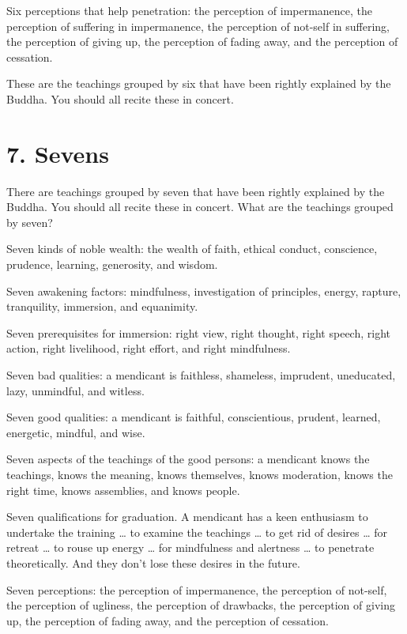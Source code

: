\documentclass[12pt,openany]{book}%
\begin{document}
Six perceptions that help penetration: the perception of impermanence, the perception of suffering in impermanence, the perception of not-self in suffering, the perception of giving up, the perception of fading away, and the perception of cessation. 

These are the teachings grouped by six that have been rightly explained by the Buddha. You should all recite these in concert. 

\section*{7. Sevens }

There are teachings grouped by seven that have been rightly explained by the Buddha. You should all recite these in concert. What are the teachings grouped by seven? 

Seven kinds of noble wealth: the wealth of faith, ethical conduct, conscience, prudence, learning, generosity, and wisdom. 

Seven awakening factors: mindfulness, investigation of principles, energy, rapture, tranquility, immersion, and equanimity. 

Seven prerequisites for immersion: right view, right thought, right speech, right action, right livelihood, right effort, and right mindfulness. 

Seven bad qualities: a mendicant is faithless, shameless, imprudent, uneducated, lazy, unmindful, and witless. 

Seven good qualities: a mendicant is faithful, conscientious, prudent, learned, energetic, mindful, and wise. 

Seven aspects of the teachings of the good persons: a mendicant knows the teachings, knows the meaning, knows themselves, knows moderation, knows the right time, knows assemblies, and knows people. 

Seven qualifications for graduation. A mendicant has a keen enthusiasm to undertake the training … to examine the teachings … to get rid of desires … for retreat … to rouse up energy … for mindfulness and alertness … to penetrate theoretically. And they don’t lose these desires in the future. 

Seven perceptions: the perception of impermanence, the perception of not-self, the perception of ugliness, the perception of drawbacks, the perception of giving up, the perception of fading away, and the perception of cessation. 
\end{document}
